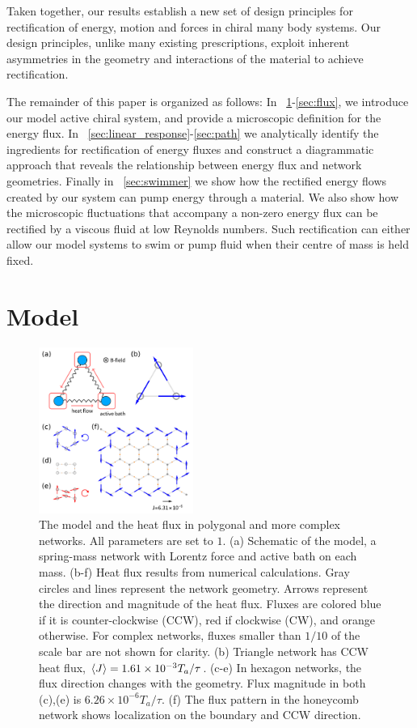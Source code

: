 \documentclass[
 preprint,
 preprintnumbers,
 amsmath,amssymb,
 aps,
 pre,
 longbibliography,
 superscriptaddress,
 10pt, twocolumn
]{revtex4-1}
\begin{document}
Taken together, our results establish a new set of design principles for rectification of energy, motion and forces in chiral many body systems. Our design principles, unlike many existing prescriptions, exploit inherent asymmetries in the geometry and interactions of the material to achieve rectification.


The remainder of this paper is organized as follows:
In \secname~\ref{sec:model}-\ref{sec:flux}, we introduce our model active chiral system, and provide a microscopic definition for the energy flux.
In \secname~\ref{sec:linear_response}-\ref{sec:path} we analytically identify the ingredients for rectification of energy fluxes and construct a diagrammatic approach that reveals the relationship between energy flux and network geometries.
Finally in \secname~\ref{sec:swimmer} we show how the rectified energy flows created by our system can pump energy through a material. We also show how the microscopic fluctuations that accompany a non-zero energy flux can be rectified by a viscous fluid at low Reynolds numbers. Such rectification can either allow our model systems to swim or pump fluid when their centre of mass is held fixed.


\section{Model} \label{sec:model}

\begin{figure}[ht]
	\centering
	\includegraphics[width=0.45\textwidth]{1_model_and_result.pdf}
    \caption{The model and the heat flux in polygonal and more complex networks. All parameters are set to $1$.
    (a) Schematic of the model, a spring-mass network with Lorentz force and active bath on each mass.
    (b-f) Heat flux results from numerical calculations. Gray circles and lines represent the network geometry. Arrows represent the direction and magnitude of the heat flux. Fluxes are colored blue if it is counter-clockwise (CCW), red if clockwise (CW), and orange otherwise. For complex networks, fluxes smaller than $1/10$ of the scale bar are not shown for clarity.
    (b) Triangle network has CCW heat flux, $\expval{J}=1.61\times 10^{-3} T_a/\tau$.
    (c-e) In hexagon networks, the flux direction changes with the geometry. Flux magnitude in both (c),(e) is $6.26\times 10^{-6} T_a/\tau$.
    (f) The flux pattern in the honeycomb network shows localization on the boundary and CCW direction.
    }
    \label{fig:model_and_result}
\end{figure}
\end{document}
